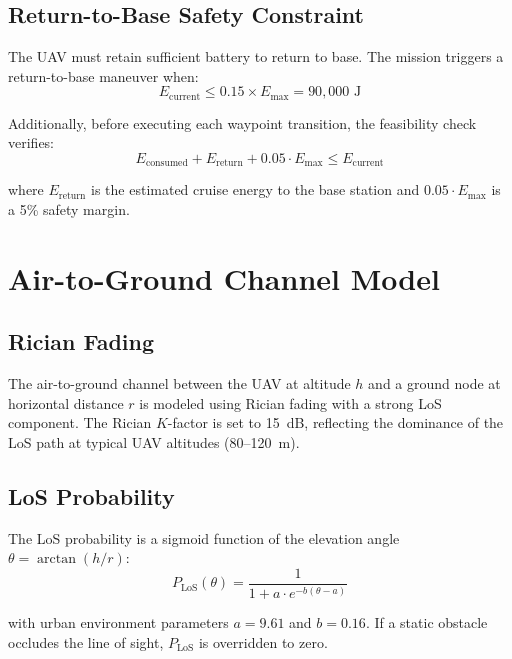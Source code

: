 \documentclass[12pt, a4paper, oneside]{report}
\begin{document}
\subsection{Return-to-Base Safety Constraint}

The UAV must retain sufficient battery to return to base. The mission triggers a return-to-base maneuver when:
\begin{equation}
E_{\text{current}} \leq 0.15 \times E_{\max} = 90{,}000 \text{ J}
\label{eq:return_threshold}
\end{equation}

Additionally, before executing each waypoint transition, the feasibility check verifies:
\begin{equation}
E_{\text{consumed}} + E_{\text{return}} + 0.05 \cdot E_{\max} \leq E_{\text{current}}
\label{eq:return_check}
\end{equation}

where $E_{\text{return}}$ is the estimated cruise energy to the base station and $0.05 \cdot E_{\max}$ is a 5\% safety margin.

\section{Air-to-Ground Channel Model}
\label{sec:channel_model}

\subsection{Rician Fading}

The air-to-ground channel between the UAV at altitude $h$ and a ground node at horizontal distance $r$ is modeled using Rician fading with a strong LoS component. The Rician $K$-factor is set to 15~dB, reflecting the dominance of the LoS path at typical UAV altitudes (80--120~m).

\subsection{LoS Probability}

The LoS probability is a sigmoid function of the elevation angle $\theta = \arctan(h/r)$:
\begin{equation}
P_{\text{LoS}}(\theta) = \frac{1}{1 + a \cdot e^{-b(\theta - a)}}
\label{eq:plos}
\end{equation}

with urban environment parameters $a = 9.61$ and $b = 0.16$. If a static obstacle occludes the line of sight, $P_{\text{LoS}}$ is overridden to zero.
\end{document}
